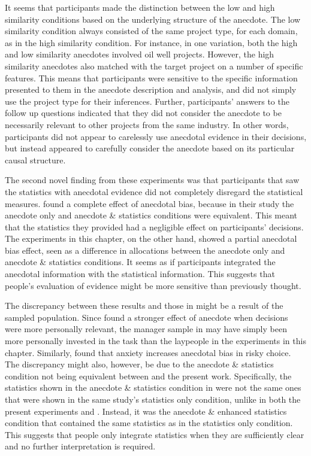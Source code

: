 \documentclass[a4paper, nobind, dvipsnames]{templates/ociamthesis}
\theoremstyle{definition}
\theoremstyle{definition}
\theoremstyle{definition}
\theoremstyle{definition}
\theoremstyle{remark}
\begin{document}
It seems that participants made the distinction between the low and high
similarity conditions based on the underlying structure of the anecdote. The low
similarity condition always consisted of the same project type, for each domain,
as in the high similarity condition. For instance, in one variation, both the
high and low similarity anecdotes involved oil well projects. However, the high
similarity anecdotes also matched with the target project on a number of
specific features. This means that participants were sensitive to the specific
information presented to them in the anecdote description and analysis, and did
not simply use the project type for their inferences. Further, participants'
answers to the follow up questions indicated that they did not consider the
anecdote to be necessarily relevant to other projects from the same industry. In
other words, participants did not appear to carelessly use anecdotal evidence in
their decisions, but instead appeared to carefully consider the anecdote based
on its particular causal structure.

The second novel finding from these experiments was that participants that saw
the statistics with anecdotal evidence did not completely disregard the
statistical measures. \textcite{wainberg2013} found a complete effect of anecdotal bias,
because in their study the anecdote only and anecdote \& statistics conditions
were equivalent. This meant that the statistics they provided had a negligible
effect on participants' decisions. The experiments in this chapter, on the other
hand, showed a partial anecdotal bias effect, seen as a difference in
allocations between the anecdote only and anecdote \& statistics conditions. It
seems as if participants integrated the anecdotal information with the
statistical information. This suggests that people's evaluation of evidence
might be more sensitive than previously thought.

The discrepancy between these results and those in \textcite{wainberg2013} might be a
result of the sampled population. Since \textcite{freling2020} found a stronger effect of
anecdote when decisions were more personally relevant, the manager sample in
\textcite{wainberg2013} may have simply been more personally invested in the task than the
laypeople in the experiments in this chapter. Similarly, \textcite{yang2015} found that
anxiety increases anecdotal bias in risky choice. The discrepancy might also,
however, be due to the anecdote \& statistics condition not being equivalent
between \textcite{wainberg2013} and the present work. Specifically, the statistics shown
in the anecdote \& statistics condition in \textcite{wainberg2013} were not the same ones
that were shown in the same study's statistics only condition, unlike in both
the present experiments and \textcite{wainberg2018}. Instead, it was the anecdote \&
enhanced statistics condition that contained the same statistics as in the
statistics only condition. This suggests that people only integrate statistics
when they are sufficiently clear and no further interpretation is required.
\end{document}
